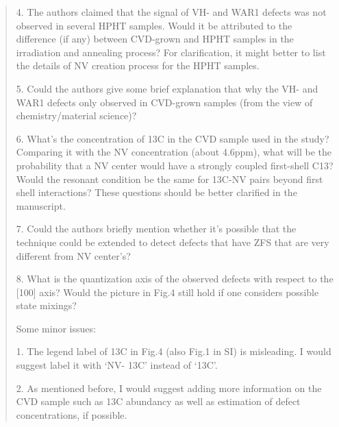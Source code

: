 \documentclass{article}
\begin{document}
\begin{quote}
4. The authors claimed that the signal of VH- and WAR1 defects was not observed in several HPHT samples. Would it be attributed to the difference (if any) between CVD-grown and HPHT samples in the irradiation and annealing process? For clarification, it might better to list the details of NV creation process for the HPHT samples.

5. Could the authors give some brief explanation that why the VH- and WAR1 defects only observed in CVD-grown samples (from the view of chemistry/material science)?

6. What’s the concentration of 13C in the CVD sample used in the study? Comparing it with the NV concentration (about 4.6ppm), what will be the probability that a NV center would have a strongly coupled first-shell C13? Would the resonant condition be the same for 13C-NV pairs beyond first shell interactions? These questions should be better clarified in the manuscript.

7. Could the authors briefly mention whether it’s possible that the technique could be extended to detect defects that have ZFS that are very different from NV center’s?

8. What is the quantization axis of the observed defects with respect to the [100] axis? Would the picture in Fig.4 still hold if one considers possible state mixings? 

Some minor issues:

1. The legend label of 13C in Fig.4 (also Fig.1 in SI) is misleading. I would suggest label it with ‘NV- 13C’ instead of ‘13C’.

2. As mentioned before, I would suggest adding more information on the CVD sample such as 13C abundancy as well as estimation of defect concentrations, if possible.
\end{quote}
\end{document}
